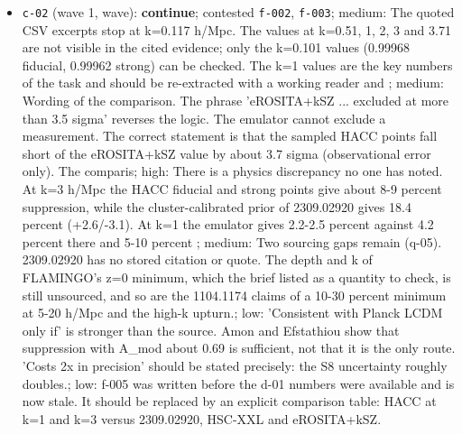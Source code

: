 \documentclass[11pt,a4paper]{article}
\begin{document}
\begin{itemize}
  \item \texttt{c-02} (wave 1, wave): \textbf{continue}; contested \texttt{f-002}, \texttt{f-003}; medium: The quoted CSV excerpts stop at k=0.117 h/Mpc. The values at k=0.51, 1, 2, 3 and 3.71 are not visible in the cited evidence; only the k=0.101 values (0.99968 fiducial, 0.99962 strong) can be checked. The k=1 values are the key numbers of the task and should be re-extracted with a working reader and ; medium: Wording of the comparison. The phrase 'eROSITA+kSZ ... excluded at more than 3.5 sigma' reverses the logic. The emulator cannot exclude a measurement. The correct statement is that the sampled HACC points fall short of the eROSITA+kSZ value by about 3.7 sigma (observational error only). The comparis; high: There is a physics discrepancy no one has noted. At k=3 h/Mpc the HACC fiducial and strong points give about 8-9 percent suppression, while the cluster-calibrated prior of 2309.02920 gives 18.4 percent (+2.6/-3.1). At k=1 the emulator gives 2.2-2.5 percent against 4.2 percent there and 5-10 percent ; medium: Two sourcing gaps remain (q-05). 2309.02920 has no stored citation or quote. The depth and k of FLAMINGO's z=0 minimum, which the brief listed as a quantity to check, is still unsourced, and so are the 1104.1174 claims of a 10-30 percent minimum at 5-20 h/Mpc and the high-k upturn.; low: 'Consistent with Planck LCDM only if' is stronger than the source. Amon and Efstathiou show that suppression with A\_mod about 0.69 is sufficient, not that it is the only route. 'Costs 2x in precision' should be stated precisely: the S8 uncertainty roughly doubles.; low: f-005 was written before the d-01 numbers were available and is now stale. It should be replaced by an explicit comparison table: HACC at k=1 and k=3 versus 2309.02920, HSC-XXL and eROSITA+kSZ.

\end{itemize}
\end{document}
